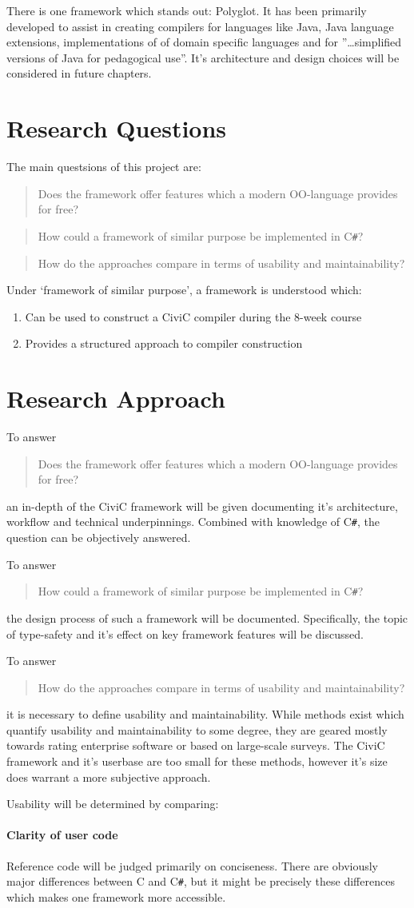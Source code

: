 \documentclass[twoside,openright]{uva-bachelor-thesis}
\newcommand{\cs}{C\texttt{\#}\xspace}
\newcommand\researchquestionformat[1]{\begin{quote}#1\end{quote}}
\newcommand\firstquestion{\researchquestionformat{Does the framework offer features which a modern OO-language provides for free?}}
\newcommand\secondquestion{\researchquestionformat{How could a framework of similar purpose be implemented in \cs?}}
\newcommand\thirdquestion{\researchquestionformat{How do the approaches compare in terms of usability and maintainability?}}
\begin{document}
		There is one framework which stands out: Polyglot\cite{polyglot}. It has been primarily developed to assist in creating compilers for languages like Java, Java language extensions, implementations of of domain specific languages and for ''\ldots simplified versions of Java for pedagogical use''. It's architecture and design choices will be considered in future chapters.
		
		
	\section{Research Questions}
		The main questsions of this project are:
		\firstquestion
		\secondquestion
		\thirdquestion
		
		Under `framework of similar purpose', a framework is understood which:
		\begin{enumerate}
			\item Can be used to construct a CiviC compiler during the 8-week course
			\item Provides a structured approach to compiler construction
		\end{enumerate}

	
	\section{Research Approach}
		To answer \firstquestion an in-depth of the CiviC framework will be given documenting it's architecture, workflow and technical underpinnings. Combined with knowledge of \cs, the question can be objectively answered.
		
		To answer \secondquestion the design process of such a framework will be documented. Specifically, the topic of type-safety and it's effect on key framework features will be discussed.
		
		To answer \thirdquestion it is necessary to define usability and maintainability. While methods exist which quantify usability and maintainability to some degree, they are geared mostly towards rating enterprise software or based on large-scale surveys. The CiviC framework and it's userbase are too small for these methods, however it's size does warrant a more subjective approach.
		
		Usability will be determined by comparing:
		\paragraph{Clarity of user code}
			Reference code will be judged primarily on conciseness. There are obviously major differences between C and \cs, but it might be precisely these differences which makes one framework more accessible.
		
\end{document}
